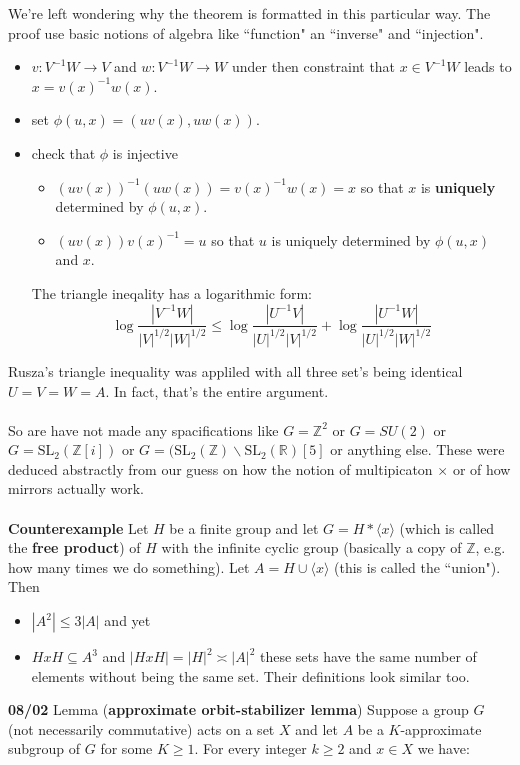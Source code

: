 \documentclass[12pt]{article}
\begin{document}
{We're left wondering why the theorem is formatted in this particular way.  The proof use basic notions of algebra like ``function" an  ``inverse" and ``injection".
\begin{itemize}
\item $v : V^{-1} W \to V$ and $w : V^{-1} W \to W$ under then constraint 
that $x \in V^{-1}W$ leads to $x = v(x)^{-1} w(x)$.  
\item set $\phi(u,x) = (uv(x), uw(x))$.
\item check that $\phi$ is injective
\begin{itemize}
\item $(uv(x))^{-1} (uw(x)) = v(x)^{-1} w(x) = x $ so that $x$ is {\color{red}\textbf{uniquely}} determined by $\phi(u,x)$.  
\item $(uv(x)) v(x)^{-1} = u $ so that $u$ is uniquely determined by $\phi(u,x)$ and $x$.
\end{itemize}
The triangle ineqality has a logarithmic form:
$$ \log \frac{|V^{-1}W|}{|V|^{1/2}|W|^{1/2}} 
\leq \log \frac{|U^{-1}V|}{|U|^{1/2}|V|^{1/2}} + \log \frac{|U^{-1}W|}{|U|^{1/2}|W|^{1/2}}$$
\end{itemize}
Rusza's triangle inequality was appliled with all three set's being identical $U = V = W = A$.  In fact, that's the entire argument. \\ \\
So are have not made any spacifications like $G = \mathbb{Z}^2$ or $G = SU(2)$ or $G = \text{SL}_2(\mathbb{Z}[i])$ or $G = (\text{SL}_2(\mathbb{Z}) \backslash \text{SL}_2(\mathbb{R})[5]$ or anything else.  These were deduced abstractly from our guess on how the notion of multipicaton $\times$ or of how mirrors actually work. \\ \\
\textbf{Counterexample} Let $H$ be a finite group and let $G = H \ast \langle x \rangle$ (which is called the \textbf{free product}) of $H$ with the infinite cyclic group (basically a copy of $\mathbb{Z}$, e.g. how many times we do something).  Let $A = H \cup \langle x \rangle$ (this is called the ``union").  Then 
\begin{itemize}
\item $|A^2| \leq 3 |A|$ and yet
\item $HxH \subseteq A^3$ and $|HxH| = |H|^2 \asymp |A|^2$ these sets have the same number of elements without being the same set.  Their definitions look similar too.
\end{itemize} 
\textbf{08/02} Lemma (\textbf{approximate orbit-stabilizer lemma}) Suppose a group $G$ (not necessarily commutative) acts on a set $X$ and let $A$ be a $K$-approximate subgroup of $G$ for some $K \geq 1$.  For every integer $k \geq 2$ and $x \in X$ we have:
}
\end{document}
